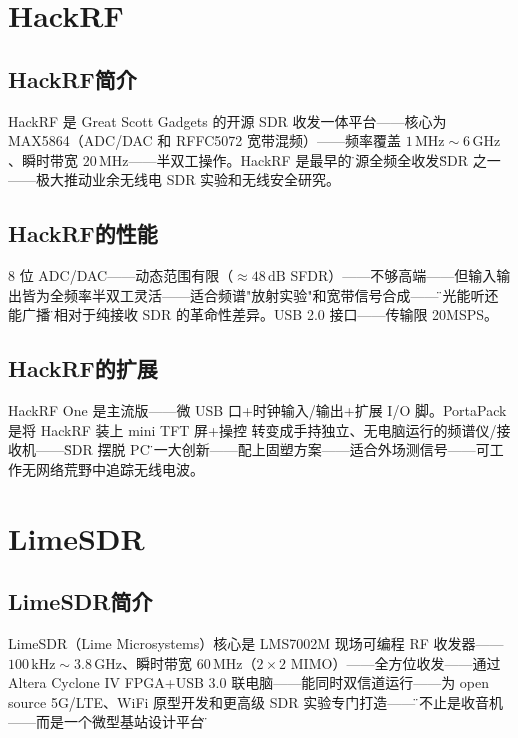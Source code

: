 \documentclass[12pt,UTF8]{ctexbook}
\begin{document}
\section{HackRF}
\label{sec:hackrf}

\subsection{HackRF简介}

HackRF 是 Great Scott Gadgets 的开源 SDR 收发一体平台——核心为 MAX5864（ADC/DAC 和 RFFC5072 宽带混频）——频率覆盖 $1\,\mathrm{MHz}\sim6\,\mathrm{GHz}$、瞬时带宽 $20\,\mathrm{MHz}$——半双工操作。HackRF 是最早的\"开源全频全收发\" SDR 之一——极大推动业余无线电 SDR 实验和无线安全研究。

\subsection{HackRF的性能}

$8$ 位 ADC/DAC——动态范围有限（$\approx48\,\mathrm{dB}$ SFDR）——不够高端——但输入输出皆为全频率半双工灵活——适合频谱"放射实验"和宽带信号合成——\"不光能听还能广播\"是相对于纯接收 SDR 的革命性差异。USB 2.0 接口——传输限 20MSPS。

\subsection{HackRF的扩展}

HackRF One 是主流版——微 USB 口+时钟输入/输出+扩展 I/O 脚。PortaPack 是将 HackRF 装上 mini TFT 屏+操控 转变成手持独立、无电脑运行的频谱仪/接收机——\"SDR 摆脱 PC\"的一大创新——配上固塑方案——适合外场测信号——可工作无网络荒野中追踪无线电波。

\section{LimeSDR}
\label{sec:limesdr}

\subsection{LimeSDR简介}

LimeSDR（Lime Microsystems）核心是 LMS7002M 现场可编程 RF 收发器——$100\,\mathrm{kHz}\sim3.8\,\mathrm{GHz}$、瞬时带宽 $60\,\mathrm{MHz}$（$2\times2$ MIMO）——全方位收发——通过 Altera Cyclone IV FPGA+USB 3.0 联电脑——能同时双信道运行——为 open source 5G/LTE、WiFi 原型开发和更高级 SDR 实验专门打造——\"它不止是收音机——而是一个微型基站设计平台\"。
\end{document}
